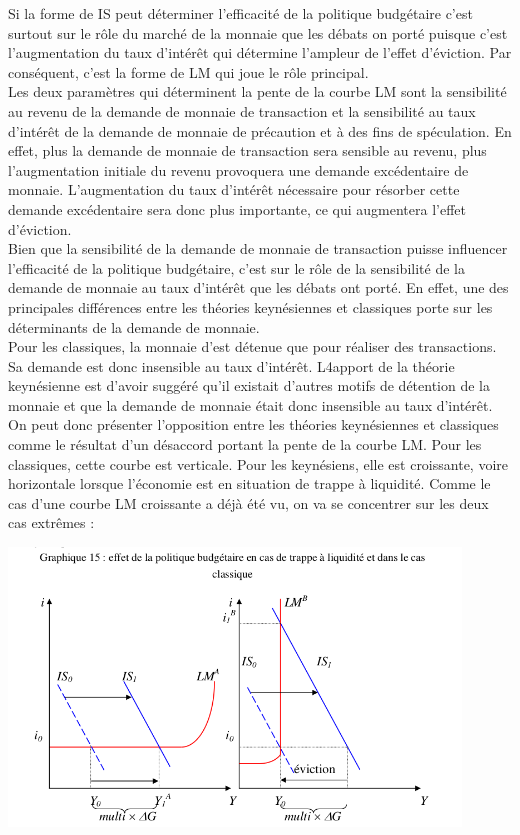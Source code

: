 \documentclass[10pt]{book}
\begin{document}
Si la forme de IS peut déterminer l'efficacité de la politique budgétaire c'est surtout sur le rôle du marché de la monnaie que les débats on porté puisque c'est l'augmentation du taux d'intérêt qui détermine l'ampleur de  l'effet d'éviction. Par conséquent, c'est la forme de LM qui joue le rôle principal. \\
Les deux paramètres qui déterminent la pente de la courbe LM sont la sensibilité au revenu de la demande de monnaie de transaction et la sensibilité au taux d'intérêt de la demande de monnaie de précaution et à des fins de spéculation. En effet, plus la demande de monnaie de transaction sera sensible au revenu, plus l'augmentation initiale du revenu provoquera une demande excédentaire de monnaie. L'augmentation du taux d'intérêt nécessaire pour résorber cette demande excédentaire sera donc plus importante, ce qui augmentera l'effet d'éviction. \\
Bien que la sensibilité de la demande de monnaie de transaction puisse influencer l'efficacité de la politique budgétaire, c'est sur le rôle de la sensibilité de la demande de monnaie au taux d'intérêt que les débats ont porté. En effet, une des principales différences entre les théories keynésiennes et classiques porte sur les déterminants de la demande de monnaie. \\
Pour les classiques, la monnaie d'est détenue que pour réaliser des transactions. Sa demande est donc insensible au taux d'intérêt. L4apport de la théorie keynésienne est d'avoir suggéré qu'il existait d'autres motifs de détention de la monnaie et que la demande de monnaie était donc insensible au taux d'intérêt. \\
On peut donc présenter l'opposition entre les théories keynésiennes et classiques comme le résultat d'un désaccord portant la pente de la courbe LM. Pour les classiques, cette courbe est verticale. Pour les keynésiens, elle est croissante, voire horizontale lorsque l'économie est en situation de trappe à liquidité. Comme le cas d'une courbe LM croissante a déjà été vu, on va se concentrer sur les deux cas extrêmes :
\begin{center}
  \includegraphics[width=12cm]{graph40.png}
\end{center}
\end{document}
